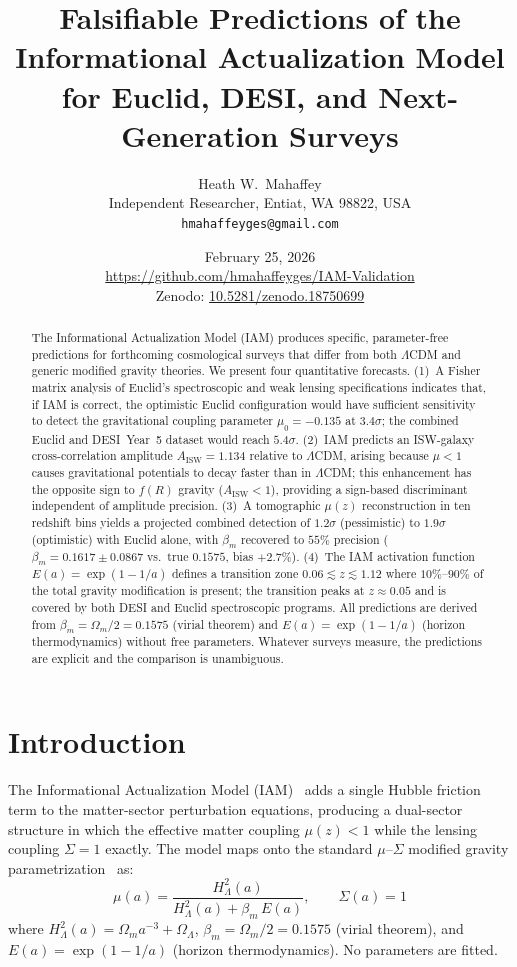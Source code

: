 \documentclass[12pt,a4paper]{article}
\title{Falsifiable Predictions of the Informational Actualization Model\\
for Euclid, DESI, and Next-Generation Surveys}
\author{Heath W.\ Mahaffey\\
\small Independent Researcher, Entiat, WA 98822, USA\\
\small \texttt{hmahaffeyges@gmail.com}}
\date{February 25, 2026\\
\small \url{https://github.com/hmahaffeyges/IAM-Validation}\\
\small Zenodo: \href{https://doi.org/10.5281/zenodo.18750699}{10.5281/zenodo.18750699}}
\begin{document}
\maketitle

\begin{abstract}
The Informational Actualization Model (IAM) produces specific, parameter-free
predictions for forthcoming cosmological surveys that differ from both $\Lambda$CDM
and generic modified gravity theories. We present four quantitative forecasts.
(1)~A Fisher matrix analysis of Euclid's spectroscopic and weak lensing
specifications indicates that, if IAM is correct, the optimistic Euclid
configuration would have sufficient sensitivity to detect the gravitational
coupling parameter $\mu_0 = -0.135$ at $3.4\sigma$; the combined Euclid and
DESI~Year~5 dataset would reach $5.4\sigma$.
(2)~IAM predicts an ISW-galaxy cross-correlation amplitude $A_\mathrm{ISW} =
1.134$ relative to $\Lambda$CDM, arising because $\mu < 1$ causes gravitational
potentials to decay faster than in $\Lambda$CDM; this enhancement has the opposite
sign to $f(R)$ gravity ($A_\mathrm{ISW} < 1$), providing a sign-based
discriminant independent of amplitude precision.
(3)~A tomographic $\mu(z)$ reconstruction in ten redshift bins yields a projected
combined detection of $1.2\sigma$ (pessimistic) to $1.9\sigma$ (optimistic) with
Euclid alone, with $\beta_m$ recovered to $55\%$ precision ($\beta_m = 0.1617
\pm 0.0867$ vs.\ true $0.1575$, bias $+2.7\%$).
(4)~The IAM activation function $E(a) = \exp(1-1/a)$ defines a transition zone
$0.06 \lesssim z \lesssim 1.12$ where $10\%$--$90\%$ of the total gravity
modification is present; the transition peaks at $z \approx 0.05$ and is
covered by both DESI and Euclid spectroscopic programs.
All predictions are derived from $\beta_m = \Omega_m/2 = 0.1575$ (virial theorem)
and $E(a) = \exp(1-1/a)$ (horizon thermodynamics) without free parameters.
Whatever surveys measure, the predictions are explicit and the comparison is
unambiguous.
\end{abstract}

\section{Introduction}

The Informational Actualization Model
(IAM)~\citep{Mahaffey2026a,Mahaffey2026b} adds a single Hubble friction term to
the matter-sector perturbation equations, producing a dual-sector structure in
which the effective matter coupling $\mu(z) < 1$ while the lensing coupling
$\Sigma = 1$ exactly. The model maps onto the standard $\mu$--$\Sigma$ modified
gravity parametrization~\citep{Pogosian2016} as:
\begin{equation}
\mu(a) = \frac{H^2_\Lambda(a)}{H^2_\Lambda(a) + \beta_m\, E(a)}, \qquad
\Sigma(a) = 1
\label{eq:mu}
\end{equation}
where $H^2_\Lambda(a) = \Omega_m a^{-3} + \Omega_\Lambda$,
$\beta_m = \Omega_m/2 = 0.1575$ (virial theorem), and
$E(a) = \exp(1-1/a)$ (horizon thermodynamics). No parameters are fitted.
\end{document}
